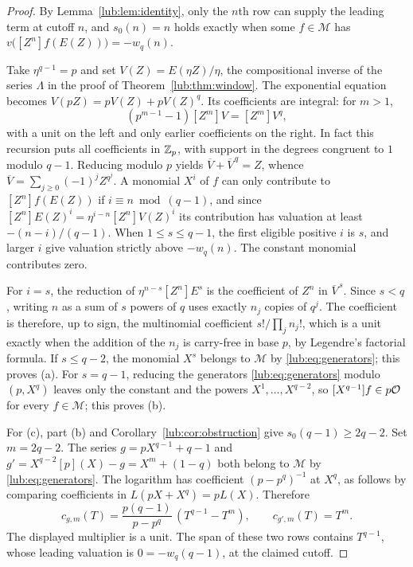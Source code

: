 \begin{proof}
By Lemma~\ref{lub:lem:identity}, only the $n$th row can supply the leading term at cutoff $n$,
and $s_0(n)=n$ holds exactly when some $f\in\mathcal M$ has
$v\bigl([Z^n]f(E(Z))\bigr)=-w_q(n)$.

Take $\eta^{q-1}=p$ and set $V(Z)=E(\eta Z)/\eta$, the compositional inverse of the series
$\Lambda$ in the proof of Theorem~\ref{lub:thm:window}. The exponential equation becomes
$V(pZ)=pV(Z)+pV(Z)^q$. Its coefficients are integral: for $m>1$,
\[
 (p^{m-1}-1)[Z^m]V=[Z^m]V^q,
\]
with a unit on the left and only earlier coefficients on the right. In fact this recursion
puts all coefficients in $\mathbb{Z}_p$, with support in the degrees congruent to $1$ modulo $q-1$.
Reducing modulo $p$ yields $\overline V+\overline V^{\,q}=Z$, whence
$\overline V=\sum_{j\ge0}(-1)^jZ^{q^j}$. A monomial $X^i$ of $f$ can only contribute to
$[Z^n]f(E(Z))$ if $i\equiv n\bmod(q-1)$, and since $[Z^n]E(Z)^i=\eta^{i-n}[Z^n]V(Z)^i$ its
contribution has valuation at least $-(n-i)/(q-1)$. When $1\le s\le q-1$, the first
eligible positive $i$ is $s$, and larger $i$ give valuation strictly above $-w_q(n)$. The
constant monomial contributes zero.

For $i=s$, the reduction of $\eta^{n-s}[Z^n]E^s$ is the coefficient of $Z^n$ in
$\overline V^{\,s}$. Since $s<q$, writing $n$ as a sum of $s$ powers of $q$ uses exactly
$n_j$ copies of $q^j$. The coefficient is therefore, up to sign, the multinomial
coefficient $s!/\prod_jn_j!$, which is a unit exactly when the addition of the $n_j$ is
carry-free in base $p$, by Legendre's factorial formula. If $s\le q-2$, the monomial $X^s$
belongs to $\mathcal M$ by \eqref{lub:eq:generators}; this proves (a). For $s=q-1$,
reducing the generators \eqref{lub:eq:generators} modulo $(p,X^q)$ leaves only the constant
and the powers $X^1,\dots,X^{q-2}$, so $[X^{q-1}]f\in p\mathcal{O}$ for every $f\in\mathcal M$;
this proves (b).

For (c), part (b) and Corollary~\ref{lub:cor:obstruction} give $s_0(q-1)\ge2q-2$. Set $m=2q-2$.
The series $g=pX^{q-1}+q-1$ and $g'=X^{q-2}[p](X)-g=X^m+(1-q)$ both belong to
$\mathcal M$ by \eqref{lub:eq:generators}. The logarithm has coefficient $(p-p^q)^{-1}$ at
$X^q$, as follows by comparing coefficients in $L(pX+X^q)=pL(X)$. Therefore
\[
 c_{g,m}(T)=\frac{p(q-1)}{p-p^q}\,(T^{q-1}-T^m),\qquad c_{g',m}(T)=T^m .
\]
The displayed multiplier is a unit. The span of these two rows contains $T^{q-1}$, whose
leading valuation is $0=-w_q(q-1)$, at the claimed cutoff.
\end{proof}

